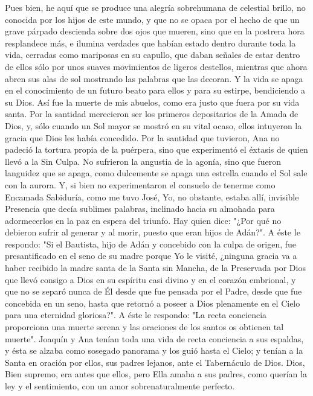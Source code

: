 \documentclass[12pt]{book} %
\begin{document}
Pues bien, he aquí que se produce una alegría sobrehumana de celestial brillo, no conocida por los hijos de este mundo, y que no se opaca por el hecho de que un grave párpado descienda sobre dos ojos que mueren, sino que en la postrera hora resplandece más, e ilumina verdades que habían estado dentro durante toda la vida, cerradas como mariposas en su capullo, que daban señales de estar dentro de ellos sólo por unos suaves movimientos de ligeros destellos, mientras que ahora abren sus alas de sol mostrando las palabras que las decoran. Y la vida se apaga en el conocimiento de un futuro beato para ellos y para su estirpe, bendiciendo a su Dios. 
Así fue la muerte de mis abuelos, como era justo que fuera por su vida santa. Por la santidad merecieron ser los 
primeros depositarios de la Amada de Dios, y, sólo cuando un Sol mayor se mostró en su vital ocaso, ellos intuyeron la gracia que Dios les había concedido. 
Por la santidad que tuvieron, Ana no padeció la tortura propia de la puérpera, sino que experimentó el éxtasis de quien 
llevó a la Sin Culpa. No sufrieron la angustia de la agonía, sino que fueron languidez que se apaga, como dulcemente se apaga una estrella cuando el Sol sale con la aurora. Y, si bien no experimentaron el consuelo de tenerme como Encamada Sabiduría, como me tuvo José, Yo, no obstante, estaba allí, invisible Presencia que decía sublimes palabras, inclinado hacia su almohada para adormecerlos en la paz en espera del triunfo. 
Hay quien dice: "¿Por qué no debieron sufrir al generar y al morir, puesto que eran hijos de Adán?". A éste le respondo: 
"Si el Bautista, hijo de Adán y concebido con la culpa de origen, fue presantificado en el seno de su madre porque Yo le visité, ¿ninguna gracia va a haber recibido la madre santa de la Santa sin Mancha, de la Preservada por Dios que llevó consigo a Dios en su espíritu casi divino y en el corazón embrional, y que no se separó nunca de Él desde que fue pensada por el Padre, desde que fue concebida en un seno, hasta que retornó a poseer a Dios plenamente en el Cielo para una eternidad gloriosa?". A éste le respondo: "La recta conciencia proporciona una muerte serena y las oraciones de los santos os obtienen tal muerte". 
Joaquín y Ana tenían toda una vida de recta conciencia a sus espaldas, y ésta se alzaba como sosegado panorama y los 
guió hasta el Cielo; y tenían a la Santa en oración por ellos, sus padres lejanos, ante el Tabernáculo de Dios. Dios, Bien supremo, era antes que ellos, pero Ella amaba a sus padres, como querían la ley y el sentimiento, con un amor sobrenaturalmente perfecto. 
 
\end{document}
